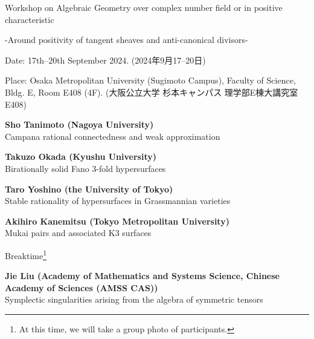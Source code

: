 \documentclass[dvipdfmx,a4paper,12pt]{article}
\theoremstyle{plain} %
\theoremstyle{definition} %
\begin{document}
\begin{center}
  {\LARGE Workshop on Algebraic Geometry over complex number field or in positive characteristic}
 
  {\large -Around positivity of tangent sheaves and anti-canonical divisors-}
  \end{center}
  
\vskip5mm
\begin{flushleft}
{ Date: 17th--20th September 2024. (2024年9月17--20日)}


{Place: Osaka Metropolitan University (Sugimoto Campus), Faculty of Science, Bldg. E, Room E408 (4F). }
{(大阪公立大学 杉本キャンパス 理学部E棟大講究室 E408)}

\end{flushleft}




\vskip8mm
\vskip3mm

\vskip1mm
{\bf Sho Tanimoto (Nagoya University)}\\
 Campana rational connectedness and weak approximation
\vskip3mm

{\bf Takuzo Okada (Kyushu University)}\\
Birationally solid Fano 3-fold hypersurfaces
\vskip3mm

{\bf Taro Yoshino (the University of Tokyo)}\\
Stable rationality of hypersurfaces in Grassmannian varieties
\vskip5mm


\vskip1mm
{\bf Akihiro Kanemitsu (Tokyo Metropolitan University)}\\
Mukai pairs and associated K3 surfaces
\vskip3mm

 Breaktime\footnote{At this time, we will take a group photo of participants.}
\vskip3mm

{\bf Jie Liu (Academy of Mathematics and Systems Science, Chinese Academy of Sciences (AMSS CAS))}\\
Symplectic singularities arising from the algebra of symmetric tensors
\vskip3mm
\end{document}
